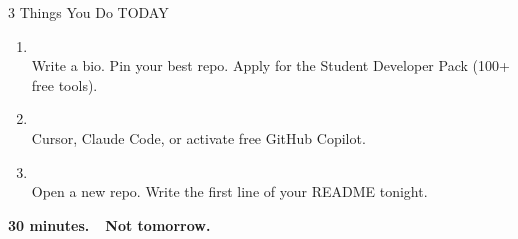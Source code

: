 
\begin{frame}{3 Things You Do TODAY}
\begin{keybox}
  \begin{enumerate}
    \item {}\\
          {\footnotesize Write a bio. Pin your best repo.
          Apply for the Student Developer Pack (100+ free tools).}
    \item {}\\
          {\footnotesize Cursor, Claude Code, or activate free GitHub Copilot.}
    \item {}\\
          {\footnotesize Open a new repo. Write the first line of your README tonight.}
  \end{enumerate}
\end{keybox}
\vspace{0.4em}
\begin{center}
  {\large\bfseries 30 minutes.\ \ Not tomorrow.}
\end{center}
\end{frame}

